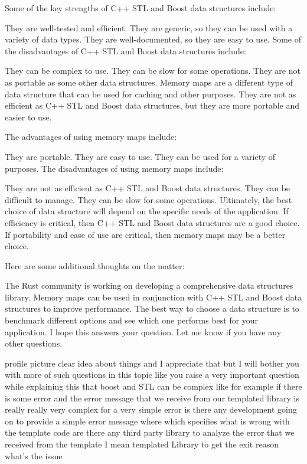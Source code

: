 \documentclass[11pt]{article}
\begin{document}
Some of the key strengths of C++ STL and Boost data structures include:

They are well-tested and efficient.
They are generic, so they can be used with a variety of data types.
They are well-documented, so they are easy to use.
Some of the disadvantages of C++ STL and Boost data structures include:

They can be complex to use.
They can be slow for some operations.
They are not as portable as some other data structures.
Memory maps are a different type of data structure that can be used for caching and other purposes. They are not as efficient as C++ STL and Boost data structures, but they are more portable and easier to use.

The advantages of using memory maps include:

They are portable.
They are easy to use.
They can be used for a variety of purposes.
The disadvantages of using memory maps include:

They are not as efficient as C++ STL and Boost data structures.
They can be difficult to manage.
They can be slow for some operations.
Ultimately, the best choice of data structure will depend on the specific needs of the application. If efficiency is critical, then C++ STL and Boost data structures are a good choice. If portability and ease of use are critical, then memory maps may be a better choice.

Here are some additional thoughts on the matter:

The Rust community is working on developing a comprehensive data structures library.
Memory maps can be used in conjunction with C++ STL and Boost data structures to improve performance.
The best way to choose a data structure is to benchmark different options and see which one performs best for your application.
I hope this answers your question. Let me know if you have any other questions.

profile picture
clear idea about things
and I appreciate that but I will bother you with more of
such questions in this topic
like you raise a very
important
question while explaining this that
boost and STL
can be complex like for example if there is some error and the error message
that we receive from our
templated library
is really really very complex
for a very simple error
is there any
development going on to provide
a simple error message where which specifies what is wrong with the template code
are there any third party library to analyze the error that we received from the template
I mean templated Library
to
get the
exit reason what's the issue
\end{document}
